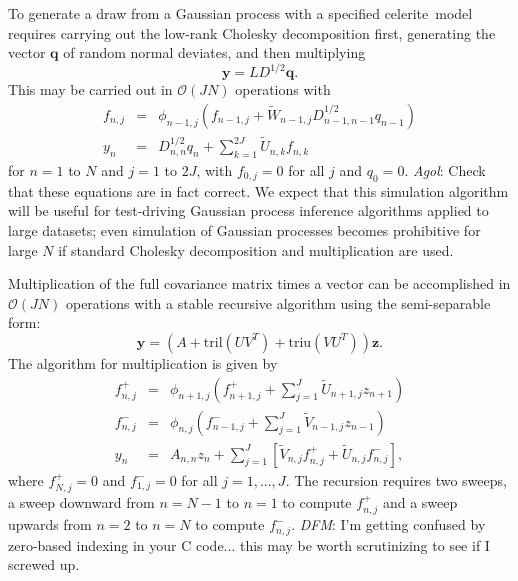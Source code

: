 \documentclass[manuscript, letterpaper]{aastex6}
\makeatletter
\let\origsubsection\subsection
\renewcommand\subsection{\@ifstar{\starsubsection}{\nostarsubsection}}
\newcommand\nostarsubsection[1]{\subsectionprelude\origsubsection{#1}}
\newcommand\starsubsection[1]{\subsectionprelude\origsubsection*{#1}}
\newcommand\subsectionprelude{\vspace{1em}}
\newcommand{\project}[1]{\textsf{#1}}
\newcommand{\celerite}{\project{celerite}}
\newcommand{\bvec}[1]{{\ensuremath{\boldsymbol{#1}}}}
\newcommand{\todo}[3]{{\color{#2}\emph{#1}: #3}}
\newcommand{\dfmtodo}[1]{\todo{DFM}{red}{#1}}
\newcommand{\agoltodo}[1]{\todo{Agol}{blue}{#1}}
\makeatother
\begin{document}
To generate a draw from a Gaussian process with a specified \celerite\ model requires carrying out the
low-rank Cholesky decomposition first, generating the vector $\bvec{q}$ of random normal deviates, and then multiplying
\begin{equation}
\bvec{y} = L D^{1/2} \bvec{q}.
\end{equation}
This may be carried out in $\mathcal{O}(JN)$ operations with
\begin{eqnarray}
f_{n,j} &=& \phi_{n-1,j} \left(f_{n-1,j} + \tilde{W}_{n-1,j} D_{n-1,n-1}^{1/2} q_{n-1}\right)\\
y_n &=& D_{n,n}^{1/2} q_n + \sum_{k=1}^{2J} \tilde{U}_{n,k} f_{n,k}
\end{eqnarray}
for $n = 1$ to $N$ and $j=1$ to $2J$, with $f_{0,j} = 0$ for all $j$ and $q_0 = 0$.
\agoltodo{Check that these equations are in fact correct.}
We expect that this simulation algorithm will be useful for test-driving Gaussian
process inference algorithms applied to large datasets; even simulation of
Gaussian processes becomes prohibitive for large $N$ if standard Cholesky decomposition
and multiplication are used.

\subsection{Multiplication and filtering}

Multiplication of the full covariance matrix times a vector can be accomplished in $\mathcal{O}(JN)$
operations with a stable recursive algorithm using the semi-separable form:
\begin{equation}
\bvec{y} =  \left(A + \mathrm{tril}(U V^T) + \mathrm{triu}(V U^T)\right) \bvec{z}.
\end{equation}
The algorithm for multiplication is given by
\begin{eqnarray}
f^+_{n,j} &=& \phi_{n+1,j} \left(f^+_{n+1,j} + \sum_{j=1}^J \tilde U_{n+1,j} z_{n+1}\right)\\
f^-_{n,j} &=& \phi_{n,j} \left(f^-_{n-1,j} + \sum_{j=1}^J \tilde V_{n-1,j} z_{n-1}\right)\\
y_n &=& A_{n,n} z_n + \sum_{j=1}^J \left[ \tilde V_{n,j} f^+_{n,j} + \tilde U_{n,j} f^-_{n,j}\right],
\end{eqnarray}
where $f^+_{N,j} = 0$ and $f^-_{1,j} = 0$ for all $j=1,...,J$.  The recursion requires
two sweeps, a sweep downward from $n=N-1$ to $n=1$ to compute $f^+_{n,j}$ and a sweep upwards
from $n=2$ to $n=N$ to compute $f^-_{n,j}$.  \dfmtodo{I'm getting confused by zero-based
indexing in your C code...  this may be worth scrutinizing to see if I screwed up.}
\end{document}
